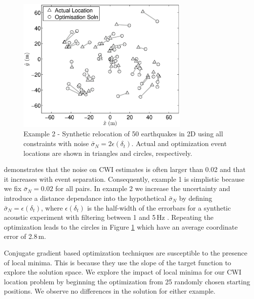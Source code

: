 \documentclass[extra, onecolumn, doublespacing]{gji}
\begin{document}
\begin{figure}
\includegraphics[width = 20pc]{diags/locs_2D_50eq_3.eps}
\caption{Example 2 - Synthetic relocation of 50 earthquakes in 2D
using all constraints with noise $\bar{\sigma}_N= 2
\epsilon(\delta_t)$.
 Actual and optimization event locations
are shown in triangles and circles, respectively.}
\label{fig-2D50eq-relocation_eg3}
\end{figure}
\citet{dr_Robinson11a} demonstrates that the noise on CWI estimates
is often larger than 0.02 and that it increases with event
separation. Consequently, example 1 is simplistic because we fix
$\bar{\sigma}_N=0.02$ for all pairs. In example 2 we increase the
uncertainty and introduce a distance dependance into the
hypothetical $\bar{\sigma}_N$ by defining
$\bar{\sigma}_N=\epsilon(\delta_t)$, where
$\epsilon(\delta_t)$ is the half-width of the errorbars for a
synthetic acoustic experiment with filtering between 1 and 5\,Hz
\citep[see Fig. 4(b) of ][]{dr_Robinson11a}. Repeating the
optimization leads to the circles in Figure
\ref{fig-2D50eq-relocation_eg3} which have an average coordinate
error of 2.8\,m.

Conjugate gradient based optimization techniques are susceptible to
the presence of local minima. This is because they use the slope of
the target function to explore the solution space. We explore the
impact of local minima for our CWI location problem by beginning the
optimization from 25 randomly chosen starting positions. We observe
no differences in the solution for either example.
\end{document}
